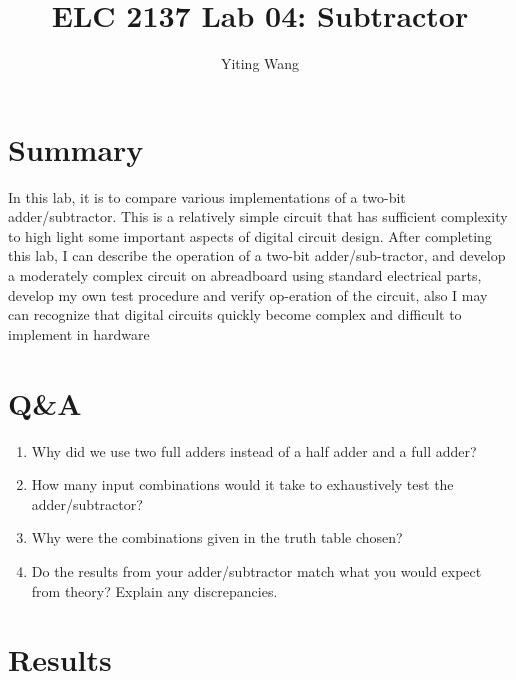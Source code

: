 \documentclass[11pt]{article}
\begin{document}
\title{ELC 2137 Lab 04: Subtractor}
\author{Yiting Wang}

\maketitle


\section*{Summary}

	In this lab, it is to compare various implementations of a two-bit adder/subtractor. This is a relatively simple circuit that has sufficient complexity to high light some important aspects of digital circuit design. After completing this lab, I can describe the operation of a two-bit adder/sub-tractor, and develop a moderately complex circuit on abreadboard using standard electrical parts, develop my own test procedure and verify op-eration of the circuit, also I may can recognize that digital circuits quickly become complex and difficult to implement in hardware



\section*{Q\&A}

	\begin{enumerate}
		\item Why did we use two full adders instead of a half adder and a full adder?\\
		
		\item How many input combinations would it take to exhaustively test the adder/subtractor?\\
		
		\item Why were the combinations given in the truth table chosen?\\
		
		\item Do the results from your adder/subtractor match what you would expect from theory? Explain any discrepancies.\\
		
	\end{enumerate}



\section*{Results}
\end{document}

